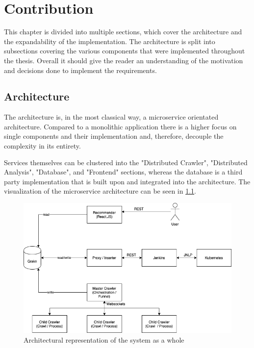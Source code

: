 \chapter{Contribution}

This chapter is divided into multiple sections, which cover the architecture and the expandability of the implementation. The architecture is split into subsections covering the various components that were implemented throughout the thesis. Overall it should give the reader an understanding of the motivation and decisions done to implement the requirements.


\section{Architecture}

The architecture is, in the most classical way, a microservice orientated architecture. Compared to a monolithic application there is a higher focus on single components and their implementation and, therefore, decouple the complexity in its entirety.

Services themselves can be clustered into the "Distributed Crawler", "Distributed Analysis", "Database", and "Frontend" sections, whereas the database is a third party implementation that is built upon and integrated into the architecture. The visualization of the microservice architecture can be seen in \ref{fig:architecture}.

\begin{figure}[H]
    \centering
    \includegraphics[scale=0.5]{graphics/architecture_v2.png}
    \caption{Architectural representation of the system as a whole}
    \label{fig:architecture}
\end{figure}

